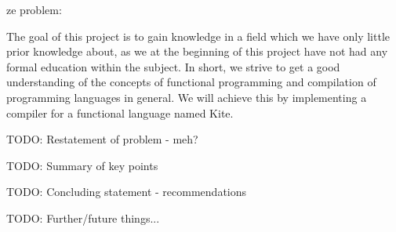 

ze problem:

The goal of this project is to gain knowledge in a field which we have only little prior knowledge about, as we at the beginning of this project have not had any formal education within the subject. In short, we strive to get a good understanding of the concepts of functional programming and compilation of programming languages in general. We will achieve this by implementing a compiler for a functional language named Kite.


TODO: Restatement of problem - meh?

TODO: Summary of key points

TODO: Concluding statement - recommendations

TODO: Further/future things...
